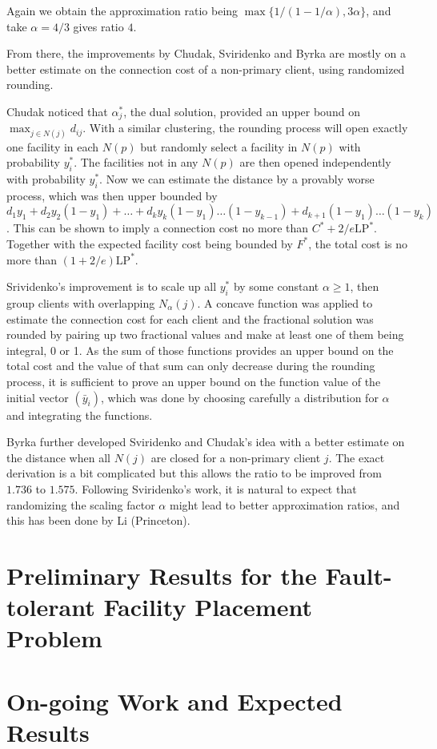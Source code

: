 \documentclass{article}
\newcommand{\LP}{\text{LP}}
\begin{document}
Again we obtain the approximation ratio being $\max\{1/(1-1/\alpha),
3\alpha\}$, and take $\alpha = 4/3$ gives ratio $4$.

From there, the improvements by Chudak, Sviridenko and Byrka are
mostly on a better estimate on the connection cost of a non-primary
client, using randomized rounding.

Chudak noticed that $\alpha_j^\ast$, the dual solution, provided an
upper bound on $\max_{j\in N(j)} d_{ij}$. With a similar clustering,
the rounding process will open exactly one facility in each $N(p)$ but
randomly select a facility in $N(p)$ with probability
$y_{i}^\ast$. The facilities not in any $N(p)$ are then opened
independently with probability $y_i^\ast$. Now we can estimate the
distance by a provably worse process, which was then upper bounded by
$d_1 y_1 + d_2 y_2 (1-y_1) + \ldots + d_k y_k (1-y_1)\ldots(1-y_{k-1})
+ d_{k+1}(1-y_1)\ldots(1-y_k)$. This can be shown to imply a
connection cost no more than $C^\ast + 2/e \LP^\ast$. Together with
the expected facility cost being bounded by $F^\ast$, the total cost
is no more than $(1+2/e)\LP^\ast$.

Srividenko's improvement is to scale up all $y_i^\ast$ by some
constant $\alpha \geq 1$, then group clients with overlapping
$N_\alpha(j)$. A concave function was applied to estimate the
connection cost for each client and the fractional solution was
rounded by pairing up two fractional values and make at least one of
them being integral, 0 or 1. As the sum of those functions provides an
upper bound on the total cost and the value of that sum can only
decrease during the rounding process, it is sufficient to prove an
upper bound on the function value of the initial vector $(\bar y_i)$,
which was done by choosing carefully a distribution for $\alpha$ and
integrating the functions.

Byrka further developed Sviridenko and Chudak's idea with a better
estimate on the distance when all $N(j)$ are closed for a non-primary
client $j$. The exact derivation is a bit complicated but this allows
the ratio to be improved from $1.736$ to $1.575$. Following
Sviridenko's work, it is natural to expect that randomizing the
scaling factor $\alpha$ might lead to better approximation ratios, and
this has been done by Li (Princeton).

\section{Preliminary Results for the Fault-tolerant Facility Placement
  Problem}

\section{On-going Work and Expected Results}
\end{document}
